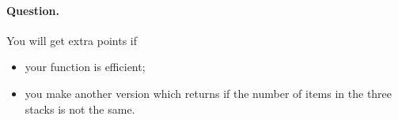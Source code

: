\paragraph{Question.} You will get extra points if
\begin{itemize}

  \item your function is efficient;

  \item you make another version which returns  if the
    number of items in the three stacks is not the same.

\end{itemize}

